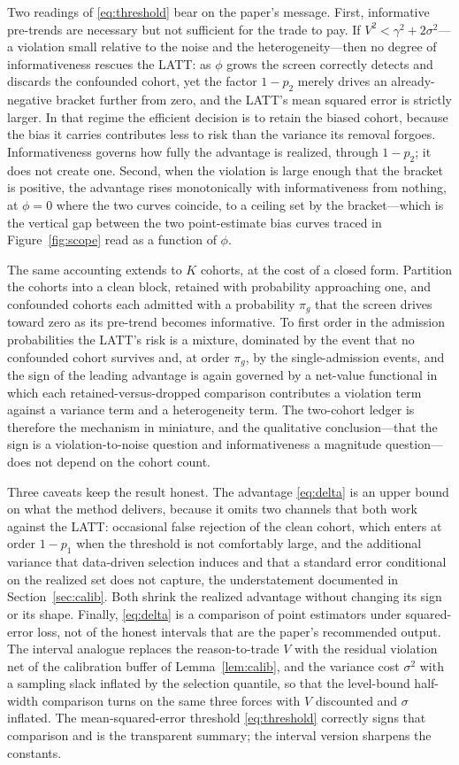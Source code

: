 Two readings of \eqref{eq:threshold} bear on the paper's message. First, informative
pre-trends are necessary but not sufficient for the trade to pay. If
$V^2<\gamma^2+2\sigma^2$---a violation small relative to the noise and the
heterogeneity---then no degree of informativeness rescues the LATT: as $\phi$ grows the
screen correctly detects and discards the confounded cohort, yet the factor $1-p_2$
merely drives an already-negative bracket further from zero, and the LATT's mean
squared error is strictly larger. In that regime the efficient decision is to retain
the biased cohort, because the bias it carries contributes less to risk than the
variance its removal forgoes. Informativeness governs how fully the advantage is
realized, through $1-p_2$; it does not create one. Second, when the violation is large
enough that the bracket is positive, the advantage rises monotonically with
informativeness from nothing, at $\phi=0$ where the two curves coincide, to a ceiling
set by the bracket---which is the vertical gap between the two point-estimate bias
curves traced in Figure~\ref{fig:scope} read as a function of $\phi$.

The same accounting extends to $K$ cohorts, at the cost of a closed form. Partition
the cohorts into a clean block, retained with probability approaching one, and
confounded cohorts each admitted with a probability $\pi_g$ that the screen drives
toward zero as its pre-trend becomes informative. To first order in the admission
probabilities the LATT's risk is a mixture, dominated by the event that no confounded
cohort survives and, at order $\pi_g$, by the single-admission events, and the sign of
the leading advantage is again governed by a net-value functional in which each
retained-versus-dropped comparison contributes a violation term against a variance
term and a heterogeneity term. The two-cohort ledger is therefore the mechanism in
miniature, and the qualitative conclusion---that the sign is a violation-to-noise
question and informativeness a magnitude question---does not depend on the cohort
count.

Three caveats keep the result honest. The advantage \eqref{eq:delta} is an upper bound
on what the method delivers, because it omits two channels that both work against the
LATT: occasional false rejection of the clean cohort, which enters at order
$1-p_1$ when the threshold is not comfortably large, and the additional variance that
data-driven selection induces and that a standard error conditional on the realized
set does not capture, the understatement documented in Section~\ref{sec:calib}. Both
shrink the realized advantage without changing its sign or its shape. Finally,
\eqref{eq:delta} is a comparison of point estimators under squared-error loss, not of
the honest intervals that are the paper's recommended output. The interval analogue
replaces the reason-to-trade $V$ with the residual violation net of the calibration
buffer of Lemma~\ref{lem:calib}, and the variance cost $\sigma^2$ with a sampling
slack inflated by the selection quantile, so that the level-bound half-width comparison
turns on the same three forces with $V$ discounted and $\sigma$ inflated. The
mean-squared-error threshold \eqref{eq:threshold} correctly signs that comparison and
is the transparent summary; the interval version sharpens the constants.
